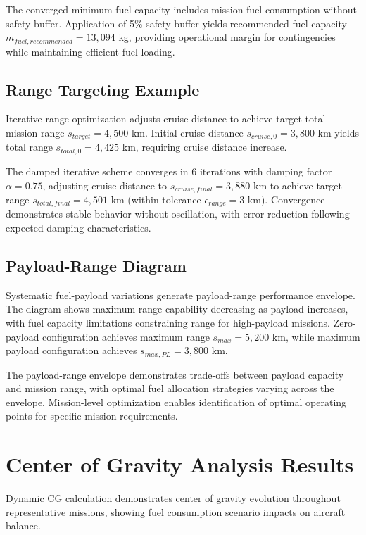 The converged minimum fuel capacity includes mission fuel consumption without safety buffer. Application of 5\% safety buffer yields recommended fuel capacity $m_{fuel,recommended} = 13,094$ kg, providing operational margin for contingencies while maintaining efficient fuel loading.

\subsection{Range Targeting Example}

Iterative range optimization adjusts cruise distance to achieve target total mission range $s_{target} = 4,500$ km. Initial cruise distance $s_{cruise,0} = 3,800$ km yields total range $s_{total,0} = 4,425$ km, requiring cruise distance increase.

The damped iterative scheme converges in 6 iterations with damping factor $\alpha = 0.75$, adjusting cruise distance to $s_{cruise,final} = 3,880$ km to achieve target range $s_{total,final} = 4,501$ km (within tolerance $\epsilon_{range} = 3$ km). Convergence demonstrates stable behavior without oscillation, with error reduction following expected damping characteristics.

\subsection{Payload-Range Diagram}

Systematic fuel-payload variations generate payload-range performance envelope. The diagram shows maximum range capability decreasing as payload increases, with fuel capacity limitations constraining range for high-payload missions. Zero-payload configuration achieves maximum range $s_{max} = 5,200$ km, while maximum payload configuration achieves $s_{max,PL} = 3,800$ km.

The payload-range envelope demonstrates trade-offs between payload capacity and mission range, with optimal fuel allocation strategies varying across the envelope. Mission-level optimization enables identification of optimal operating points for specific mission requirements.

\section{Center of Gravity Analysis Results}

Dynamic CG calculation demonstrates center of gravity evolution throughout representative missions, showing fuel consumption scenario impacts on aircraft balance.

